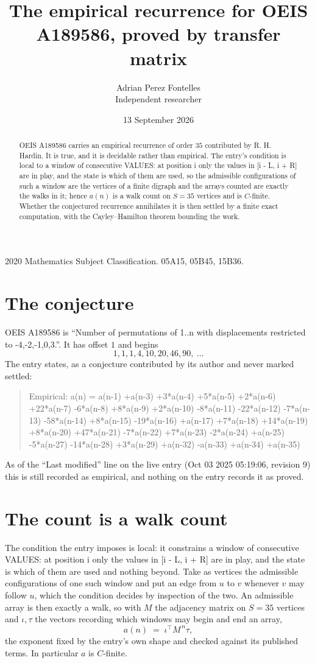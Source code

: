 \documentclass[11pt,a4paper]{article}
\title{The empirical recurrence for OEIS A189586, proved by transfer matrix}
\author{Adrian Perez Fontelles\\ \small Independent researcher}
\date{13 September 2026}
\theoremstyle{plain}
\theoremstyle{definition}
\begin{document}
\maketitle

\begin{abstract}
OEIS A189586 carries an empirical recurrence of order $35$ contributed by R. H. Hardin. It is
true, and it is decidable rather than empirical. The entry's condition is local to a window of consecutive VALUES: at position i only the values in [i - L, i + R] are in play, and the state is which of them are used, so
the admissible configurations of such a window are the vertices of a finite digraph and the
arrays counted are exactly the walks in it; hence $a(n)$ is a walk count on $S=35$ vertices
and is $C$-finite. Whether the conjectured recurrence annihilates it is then settled by a
finite exact computation, with the Cayley--Hamilton theorem bounding the work.
\end{abstract}

\noindent\small 2020 Mathematics Subject Classification. 05A15, 05B45, 15B36.\normalsize

\section{The conjecture}

OEIS A189586 is ``Number of permutations of 1..n with displacements restricted to {-4,-2,-1,0,3}.''. It has offset $1$ and begins
\[
1, 1, 1, 4, 10, 20, 46, 90,\ \dots
\]
The entry states, as a conjecture contributed by its author and never marked settled:
\begin{quote}
Empirical: a(n) = a(n-1) +a(n-3) +3*a(n-4) +5*a(n-5) +2*a(n-6) +22*a(n-7) -6*a(n-8) +8*a(n-9) +2*a(n-10) -8*a(n-11) -22*a(n-12) -7*a(n-13) -58*a(n-14) +8*a(n-15) -19*a(n-16) +a(n-17) +7*a(n-18) +14*a(n-19) +8*a(n-20) +47*a(n-21) -7*a(n-22) +7*a(n-23) -2*a(n-24) +a(n-25) -5*a(n-27) -14*a(n-28) +3*a(n-29) +a(n-32) -a(n-33) +a(n-34) +a(n-35)
\end{quote}
As of the ``Last modified'' line on the live entry (Oct 03 2025 05:19:06, revision 9) this is still
recorded as empirical, and nothing on the entry records it as proved.

\section{The count is a walk count}

The condition the entry imposes is local: it constrains a window of consecutive VALUES: at position i only the values in [i - L, i + R] are in play, and the state is which of them are used and nothing beyond. Take as
vertices the admissible configurations of one such window and put an edge from $u$ to $v$
whenever $v$ may follow $u$, which the condition decides by inspection of the two. An
admissible array is then exactly a walk, so with $M$ the adjacency matrix on $S=35$ vertices
and $\iota,\tau$ the vectors recording which windows may begin and end an array,
\[
a(n)\;=\;\iota^{\!\top}M^{\,n}\tau ,
\]
the exponent fixed by the entry's own shape and checked against its published terms. In
particular $a$ is $C$-finite.
\end{document}
